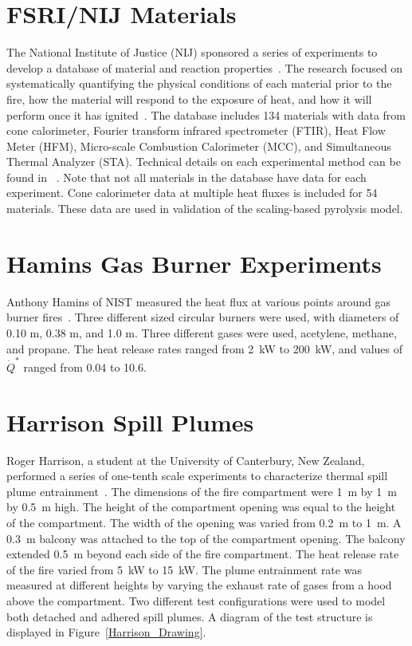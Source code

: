 \section{FSRI/NIJ Materials}
\label{FSRI_NIJ_Description}

The National Institute of Justice (NIJ) sponsored a series of experiments to develop a database of material and reaction properties~\cite{McKinnon:FSRI2023_Data}.
The research focused on systematically quantifying the physical conditions of each material prior to the fire, how the material will respond to the exposure of heat, and how it will perform once it has ignited~\cite{McKinnon:FSRI2023_User}.
The database includes 134 materials with data from cone calorimeter, Fourier transform infrared spectrometer (FTIR), Heat Flow Meter (HFM), Micro-scale Combustion Calorimeter (MCC), and Simultaneous Thermal Analyzer (STA).
Technical details on each experimental method can be found in ~\cite{McKinnon:FSRI2023_Tech}.
Note that not all materials in the database have data for each experiment.
Cone calorimeter data at multiple heat fluxes is included for 54 materials.
These data are used in validation of the scaling-based pyrolysis model.


\section{Hamins Gas Burner Experiments}
\label{Hamins_Gas_Burner_Description}

Anthony Hamins of NIST measured the heat flux at various points around gas burner fires~\cite{Hostikka:3}. Three different sized circular burners were used, with diameters of 0.10 m, 0.38 m, and 1.0 m. Three different gases were used, acetylene, methane, and propane. The heat release rates ranged from 2~kW to 200~kW, and values of $\dot{Q}^*$ ranged from 0.04 to 10.6.


\section{Harrison Spill Plumes}
\label{Harrison_Spill_Plumes_Description}

Roger Harrison, a student at the University of Canterbury, New Zealand, performed a series of one-tenth scale experiments to characterize thermal spill plume entrainment~\cite{Harrison:2009,Harrison:IAFSS2008,Harrison:FT2007,Harrison:FSJ2010}. The dimensions of the fire compartment were 1~m by 1~m by 0.5~m high.  The height of the compartment opening was equal to the height of the compartment. The width of the opening was varied from 0.2~m to 1~m.  A 0.3~m balcony was attached to the top of the compartment opening. The balcony extended 0.5~m beyond each side of the fire compartment.  The heat release rate of the fire varied from 5~kW to 15~kW.
The plume entrainment rate was measured at different heights by varying the exhaust rate of gases from a hood above the compartment.
Two different test configurations were used to model both detached and adhered spill plumes. A diagram of the test structure is displayed in Figure~\ref{Harrison_Drawing}.

